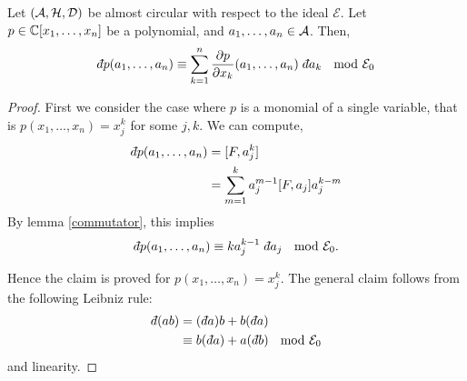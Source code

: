 \begin{lemma}
    Let $(\mathcal{A},\mathcal{H},\mathcal{D})$ be almost circular with respect
    to the ideal $\mathcal{E}$. Let $p \in \mathbb{C}[x_1,\ldots,x_n]$ be a polynomial,
    and $a_1,\ldots,a_n \in \mathcal{A}$. 
    Then,
    \begin{equation}
        \qd p(a_1,\ldots,a_n) \equiv \sum_{k=1}^n \frac{\partial p}{\partial x_k}(a_1,\ldots,a_n)\;\qd a_k\; \mod{\mathcal{E}_0}
    \end{equation}
\end{lemma}
\begin{proof}
    First we consider the case where $p$ is a monomial of a single variable,
    that is $p(x_1,\ldots,x_n) = x_j^k$ for some $j,k$. We can compute,
    \begin{align}
        \qd p(a_1,\ldots,a_n) &= [F,a_j^k] \\
        &= \sum_{m=1}^{k} a_j^{m-1} [F,a_j] a_j^{k-m}
    \end{align}
    By lemma \ref{commutator}, this implies
    \begin{align}
        \qd p(a_1,\ldots,a_n) \equiv ka_j^{k-1}\; \qd a_j\; \mod{\mathcal{E}_0}.
    \end{align}
    
    Hence the claim is proved for $p(x_1,\ldots,x_n) = x_j^k$. The general claim
    follows from the following Leibniz rule:
    \begin{align}
        \qd (ab) &= (\qd a)b + b(\qd a)\\
                 &\equiv b(\qd a) + a(\qd b) \;\mod{\mathcal{E}_0}
    \end{align}
    and linearity.
\end{proof}

